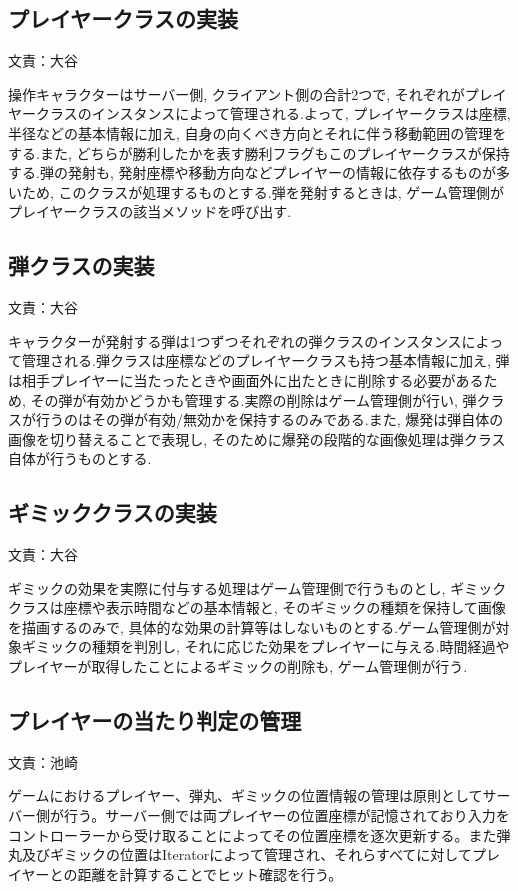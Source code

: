 \documentclass[11pt,a4j]{jarticle}
\begin{document}
\subsection{プレイヤークラスの実装}
\begin{flushright}
  文責：大谷
\end{flushright}
操作キャラクターはサーバー側, クライアント側の合計2つで, それぞれがプレイヤークラスのインスタンスによって管理される.よって, プレイヤークラスは座標, 半径などの基本情報に加え, 自身の向くべき方向とそれに伴う移動範囲の管理をする.また, どちらが勝利したかを表す勝利フラグもこのプレイヤークラスが保持する.弾の発射も, 発射座標や移動方向などプレイヤーの情報に依存するものが多いため, このクラスが処理するものとする.弾を発射するときは, ゲーム管理側がプレイヤークラスの該当メソッドを呼び出す.


\subsection{弾クラスの実装}
\begin{flushright}
  文責：大谷
\end{flushright}
キャラクターが発射する弾は1つずつそれぞれの弾クラスのインスタンスによって管理される.弾クラスは座標などのプレイヤークラスも持つ基本情報に加え, 弾は相手プレイヤーに当たったときや画面外に出たときに削除する必要があるため, その弾が有効かどうかも管理する.実際の削除はゲーム管理側が行い, 弾クラスが行うのはその弾が有効/無効かを保持するのみである.また, 爆発は弾自体の画像を切り替えることで表現し, そのために爆発の段階的な画像処理は弾クラス自体が行うものとする.




\subsection{ギミッククラスの実装}
\begin{flushright}
  文責：大谷
\end{flushright}
ギミックの効果を実際に付与する処理はゲーム管理側で行うものとし, ギミッククラスは座標や表示時間などの基本情報と, そのギミックの種類を保持して画像を描画するのみで, 具体的な効果の計算等はしないものとする.ゲーム管理側が対象ギミックの種類を判別し, それに応じた効果をプレイヤーに与える.時間経過やプレイヤーが取得したことによるギミックの削除も, ゲーム管理側が行う.




\subsection{プレイヤーの当たり判定の管理}
\begin{flushright}
  文責：池崎
\end{flushright}
ゲームにおけるプレイヤー、弾丸、ギミックの位置情報の管理は原則としてサーバー側が行う。サーバー側では両プレイヤーの位置座標が記憶されており入力をコントローラーから受け取ることによってその位置座標を逐次更新する。また弾丸及びギミックの位置はIteratorによって管理され、それらすべてに対してプレイヤーとの距離を計算することでヒット確認を行う。
\end{document}
